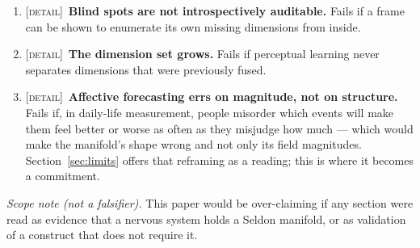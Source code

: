 \documentclass[11pt,a4paper]{article}
\theoremstyle{remark}
\begin{document}
\begin{enumerate}[leftmargin=*]
independent of the domain's recurrent structure, or if it transfers to unrelated domains under
active controls.
\item \textsc{[detail]}~\textbf{Blind spots are not introspectively auditable.} Fails if a frame can be shown to
enumerate its own missing dimensions from inside.
\item \textsc{[detail]}~\textbf{The dimension set grows.} Fails if perceptual learning never separates
dimensions that were previously fused.
\item \textsc{[detail]}~\textbf{Affective forecasting errs on magnitude, not on structure.} Fails if, in
daily-life measurement, people misorder which events will make them feel better or worse as often as
they misjudge how much \citep{moeck2026} --- which would make the manifold's shape wrong and not only
its field magnitudes. Section~\ref{sec:limits} offers that reframing as a reading; this is where it
becomes a commitment.
\end{enumerate}

\noindent\emph{Scope note (not a falsifier).} This paper would be over-claiming if any section were
read as evidence that a nervous system holds a Seldon manifold, or as validation of a construct that
does not require it.
\end{document}
